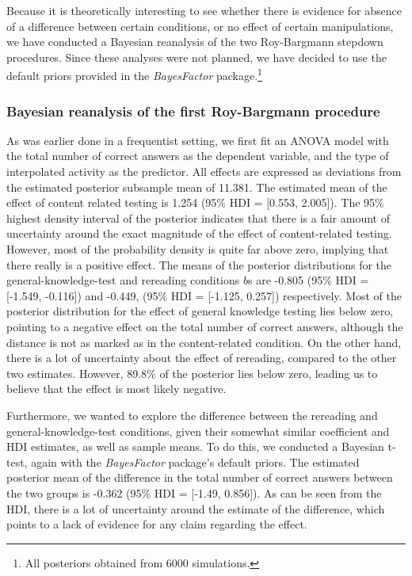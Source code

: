 \documentclass[../main.tex]{subfiles}
\begin{document}
Because it is theoretically interesting to see whether there is evidence
for absence of a difference between certain conditions, or no effect of
certain manipulations, we have conducted a Bayesian reanalysis of the
two Roy-Bargmann stepdown procedures. Since these analyses were not
planned, we have decided to use the default priors provided in the
\textit{BayesFactor} \citep{moreyBayesFactorComputationBayes2018}
package.\footnote{All posteriors obtained from 6000 simulations.}

\hypertarget{bayesian-reanalysis-of-the-first-roy-bargmann-procedure}{%
\subsubsection{Bayesian reanalysis of the first Roy-Bargmann
procedure}\label{bayesian-reanalysis-of-the-first-roy-bargmann-procedure}}

As was earlier done in a frequentist setting, we first fit an ANOVA
model with the total number of correct answers as the dependent
variable, and the type of interpolated activity as the predictor. All
effects are expressed as deviations from the estimated posterior
subsample mean of 11.381. The estimated mean of the effect of content
related testing is 1.254 (95\% HDI = {[}0.553, 2.005{]}). The 95\%
highest density interval of the posterior indicates that there is a fair
amount of uncertainty around the exact magnitude of the effect of
content-related testing. However, most of the probability density is
quite far above zero, implying that there really is a positive effect.
The means of the posterior distributions for the general-knowledge-test
and rereading conditions \(b\)s are -0.805 (95\% HDI = {[}-1.549,
-0.116{]}) and -0.449, (95\% HDI = {[}-1.125, 0.257{]}) respectively.
Most of the posterior distribution for the effect of general knowledge
testing lies below zero, pointing to a negative effect on the total
number of correct answers, although the distance is not as marked as in
the content-related condition. On the other hand, there is a lot of
uncertainty about the effect of rereading, compared to the other two
estimates. However, 89.8\% of the posterior lies below zero, leading us
to believe that the effect is most likely negative.

Furthermore, we wanted to explore the difference between the rereading
and general-knowledge-test conditions, given their somewhat similar
coefficient and HDI estimates, as well as sample means. To do this, we
conducted a Bayesian t-test, again with the \textit{BayesFactor}
package's default priors. The estimated posterior mean of the difference
in the total number of correct answers between the two groups is -0.362
(95\% HDI = {[}-1.49, 0.856{]}). As can be seen from the HDI, there is a
lot of uncertainty around the estimate of the difference, which points
to a lack of evidence for any claim regarding the effect.
\end{document}
